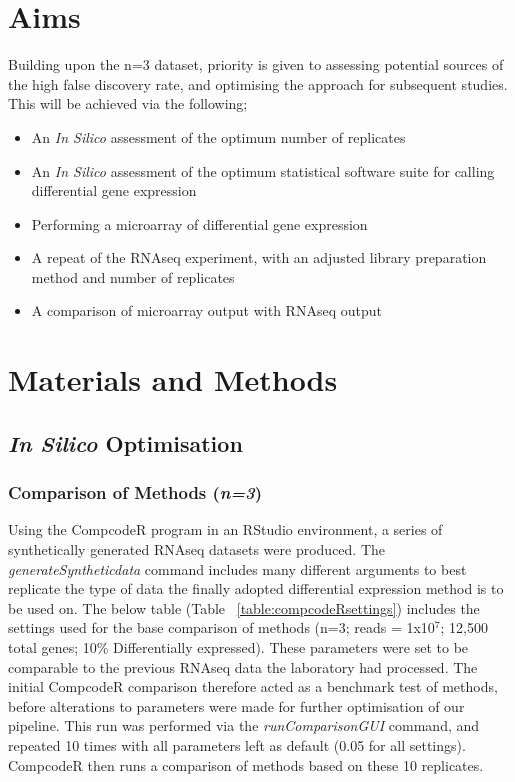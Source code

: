 \section{Aims}
Building upon the n=3 dataset, priority is given to assessing potential sources of the high false discovery rate, and optimising the approach for subsequent studies. This will be achieved via the following;\\
\begin{itemize}
\singlespacing
  \item An \textit{In Silico} assessment of the optimum number of replicates  \\
  \item An \textit{In Silico} assessment of the optimum statistical software suite for calling differential gene expression  \\
  \item Performing a microarray of differential gene expression  \\
  \item A repeat of the RNAseq experiment, with an adjusted library preparation method and number of replicates  \\
  \item A comparison of microarray output with RNAseq output \\
\end{itemize}


\section{Materials and Methods}

\subsection{\textit{In Silico} Optimisation}

\subsubsection{Comparison of Methods (\textit{n=3})} \label{CompMethods}

Using the CompcodeR program in an RStudio environment, a series of synthetically generated RNAseq datasets were produced.  The \textit{generateSyntheticdata} command includes many different arguments to best replicate the type of data the finally adopted differential expression method is to be used on. The below table (Table ~\ref{table:compcodeRsettings}) includes the settings used for the base comparison of methods (n=3; reads = 1x10$^{7}$; 12,500 total genes; 10\% Differentially expressed). These parameters were set to be comparable to the previous RNAseq data the laboratory had processed. The initial CompcodeR comparison therefore acted as a benchmark test of methods, before alterations to parameters were made for further optimisation of our pipeline. This run was performed via the \textit{runComparisonGUI} command, and repeated 10 times with all parameters left as default (0.05 for all settings). CompcodeR then runs a comparison of methods based on these 10 replicates. \\


